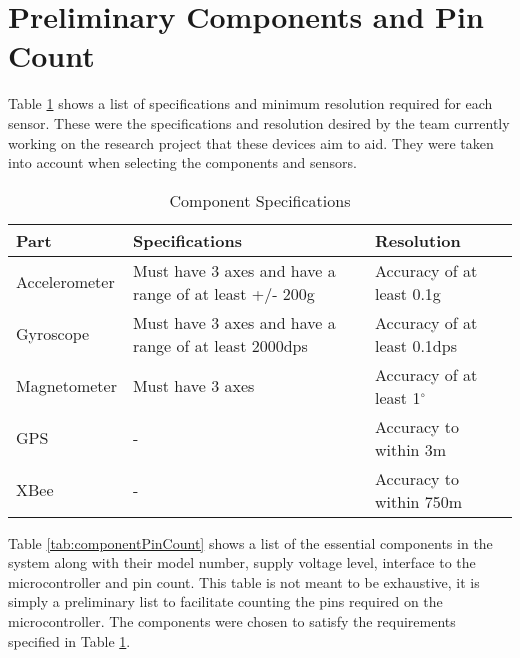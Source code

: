 \section{Preliminary Components and Pin Count}

Table \ref{tab:sensorResolution} shows a list of specifications and minimum resolution required for each sensor.  These were the specifications and resolution desired by the team currently working on the research project that these devices aim to aid.  They were taken into account when selecting the components and sensors.

\begin{table}[H]
\setlength{\extrarowheight}{1.5pt}
  \centering
  \caption{Component Specifications}
    \begin{tabular}{|m{1in}|m{2.2in}|m{2.2in}|}
    \hline
     Part  &  Specifications &  Resolution \\
    \hline \hline
    Accelerometer & Must have 3 axes and have a range of at least +/- 200g & Accuracy of at least 0.1g \\ \hline
    Gyroscope & Must have 3 axes and have a range of at least 2000dps & Accuracy of at least 0.1dps \\ \hline
    Magnetometer & Must have 3 axes  & Accuracy of at least 1$^{\circ}$ \\ \hline
    GPS   & - & Accuracy to within 3m  \\ \hline 
    XBee  & - & Accuracy to within 750m \\ \hline
    
    \end{tabular}%
  \label{tab:sensorResolution}%
\end{table}%

Table \ref{tab:componentPinCount} shows a list of the essential components in the system along with their model number, supply voltage level, interface to the microcontroller and pin count.  This table is not meant to be exhaustive, it is simply a preliminary list to facilitate counting the pins required on the microcontroller. The components were chosen to satisfy the requirements specified in Table \ref{tab:sensorResolution}.

